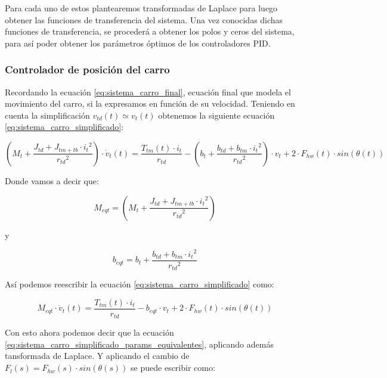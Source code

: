 \documentclass[11pt]{article}
\begin{document}
Para cada uno de estos plantearemos transformadas de Laplace para luego obtener las funciones de transferencia del sistema. Una vez conocidas dichas funciones de transferencia, se procederá a obtener los polos y ceros del sistema, para así poder obtener los parámetros óptimos de los controladores PID.

\newpage

\subsubsection{Controlador de posición del carro}
Recordando la ecuación \ref{eq:sistema_carro_final}, ecuación final que modela el movimiento del carro, si la expresamos en función de su velocidad. Teniendo en cuenta la simplificación $v_{td}(t)\simeq v_{t}(t)$ obtenemos la siguiente ecuación \ref{eq:sistema_carro_simplificado}:

\begin{equation}
	\label{eq:sistema_carro_simplificado}
	\left ( M_{t}+ \frac{J_{td}+J_{tm+tb}\cdot{i_{t}}^{2}}{{r_{td}}^{2}} \right )\cdot\dot{v}_{t}(t)=\frac{T_{tm}(t)\cdot i_{t}}{r_{td}}-\left (b_{t} +\frac{b_{td}+b_{tm}\cdot{i_{t}}^{2}}{{r_{td}}^{2}} \right )\cdot v_{t} + 2\cdot F_{hw}(t) \cdot sin \left ( \theta(t) \right )
\end{equation}

Donde vamos a decir que:

\begin{equation}
	\label{eq:sistema_carro_masa_equivalente}
	M_{eqt} = \left ( M_{t}+ \frac{J_{td}+J_{tm+tb}\cdot{i_{t}}^{2}}{{r_{td}}^{2}} \right )
\end{equation}

y

\begin{equation}
	\label{eq:sistema_carro_friccion_equivalente}
	b_{eqt} = b_{t} +\frac{b_{td}+b_{tm}\cdot{i_{t}}^{2}}{{r_{td}}^{2}}
\end{equation}

Así podemos reescribir la ecuación \ref{eq:sistema_carro_simplificado} como:

\begin{equation}
	\label{eq:sistema_carro_simplificado_params_equivalentes}
	M_{eqt}\cdot\dot{v}_{t}(t)=\frac{T_{tm}(t)\cdot i_{t}}{r_{td}}-b_{eqt}\cdot v_{t} + 2\cdot F_{hw}(t) \cdot sin \left ( \theta(t) \right )
\end{equation}

Con esto ahora podemos decir que la ecuación \ref{eq:sistema_carro_simplificado_params_equivalentes}, aplicando además tansformada de Laplace. Y aplicando el cambio de $F_{l}(s)=F_{hw}(s) \cdot sin \left ( \theta(s) \right )$ se puede escribir como:
\end{document}
